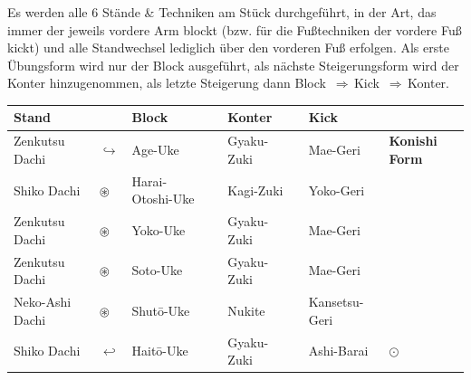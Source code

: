 \documentclass[a5paper,landscape,DIV=calc,11pt,notitlepage]{scrartcl}
\begin{document}
\begin{tcolorbox}[colback=white,colframe=GKD,coltitle=white,adjusted title=B\={o}gy\={o} R\={o}k\={u} Kyod\={o} aus dem Japan Karate-D\={o} Jinen-Kai]
	\null\vfill\null
	\begin{center}
		\parbox{\textwidth-2\tabcolsep}{Es werden alle 6 Stände \& Techniken am Stück durchgeführt, in der Art, das immer der jeweils vordere Arm blockt (bzw. für die Fußtechniken der vordere Fuß kickt) und alle Standwechsel lediglich über den vorderen Fuß erfolgen. Als erste Übungsform wird nur der Block ausgeführt, als nächste Steigerungsform wird der Konter hinzugenommen, als letzte Steigerung dann \mbox{Block \(\Rightarrow\)\,Kick \(\Rightarrow\)\,Konter.}}
	\end{center}
	\begin{tabularx}{\textwidth}{lllXlXll}
		Stand	&&Block	&&Konter	&&Kick&\\
		\midrule
		Zenkutsu Dachi 	& \(\hookrightarrow\) & Age-Uke	&&Gyaku-Zuki	&&Mae-Geri&\textbf{Konishi Form}\\
		Shiko Dachi 	& \(\circledast\) & Harai-Otoshi-Uke	&&Kagi-Zuki&&Yoko-Geri&\\
		Zenkutsu Dachi	& \(\circledast\) & Yoko-Uke	&&Gyaku-Zuki&&Mae-Geri&\\
		Zenkutsu Dachi	& \(\circledast\) & Soto-Uke	&&Gyaku-Zuki&&Mae-Geri&\\
		Neko-Ashi Dachi	& \(\circledast\) & Shut\={o}-Uke	&&Nukite&&Kansetsu-Geri&\\
		Shiko Dachi	& \(\hookleftarrow\) & Hait\={o}-Uke	&&Gyaku-Zuki&&Ashi-Barai& \(\odot\)\\
		\midrule
	\end{tabularx}\\\null\vfill\null
\end{tcolorbox}
\pagebreak
\end{document}
